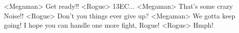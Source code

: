 <Megaman> Get ready!! 
<Rogue> {13}{EC}... 
<Megaman> That's some crazy Noise!! 
<Rogue> Don't you things ever give up? 
<Megaman> We gotta keep going! 
I hope you can handle one more fight, Rogue! 
<Rogue> Hmph! 

